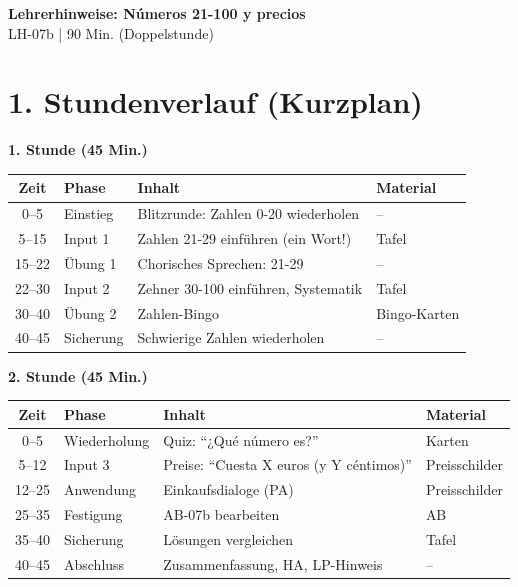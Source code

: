 \documentclass[11pt, a4paper]{article}
\newcommand{\fachfarbe}{spanisch}
\newcommand{\thema}{Números 21-100 y precios}
\newcommand{\sequenz}{07}
\newcommand{\block}{b}
\newcommand{\dauer}{90 Min. (Doppelstunde)}
\begin{document}

\begin{center}
    {\Large\bfseries\textcolor{\fachfarbe}{Lehrerhinweise: \thema}}\\[0.3em]
    {\normalsize LH-\sequenz\block{} | \dauer}
\end{center}

\vspace{10pt}


\section*{1. Stundenverlauf (Kurzplan)}

\textbf{1. Stunde (45 Min.)}

\begin{tabularx}{\textwidth}{|c|l|X|l|}
\hline
\textbf{Zeit} & \textbf{Phase} & \textbf{Inhalt} & \textbf{Material} \\
\hline
0--5 & Einstieg & Blitzrunde: Zahlen 0-20 wiederholen & -- \\
\hline
5--15 & Input 1 & Zahlen 21-29 einführen (ein Wort!) & Tafel \\
\hline
15--22 & Übung 1 & Chorisches Sprechen: 21-29 & -- \\
\hline
22--30 & Input 2 & Zehner 30-100 einführen, Systematik & Tafel \\
\hline
30--40 & Übung 2 & Zahlen-Bingo & Bingo-Karten \\
\hline
40--45 & Sicherung & Schwierige Zahlen wiederholen & -- \\
\hline
\end{tabularx}

\vspace{1em}

\textbf{2. Stunde (45 Min.)}

\begin{tabularx}{\textwidth}{|c|l|X|l|}
\hline
\textbf{Zeit} & \textbf{Phase} & \textbf{Inhalt} & \textbf{Material} \\
\hline
0--5 & Wiederholung & Quiz: ``¿Qué número es?'' & Karten \\
\hline
5--12 & Input 3 & Preise: ``Cuesta X euros (y Y céntimos)'' & Preisschilder \\
\hline
12--25 & Anwendung & Einkaufsdialoge (PA) & Preisschilder \\
\hline
25--35 & Festigung & AB-07b bearbeiten & AB \\
\hline
35--40 & Sicherung & Lösungen vergleichen & Tafel \\
\hline
40--45 & Abschluss & Zusammenfassung, HA, LP-Hinweis & -- \\
\hline
\end{tabularx}
\end{document}
